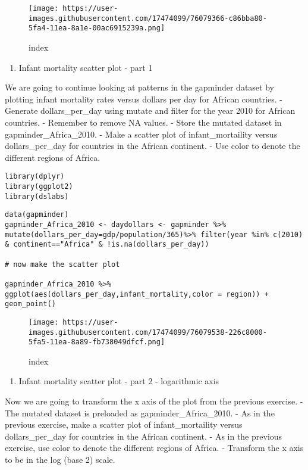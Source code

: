 \documentclass[]{article}
\providecommand{\tightlist}{%
  \setlength{\itemsep}{0pt}\setlength{\parskip}{0pt}}
\begin{document}
\begin{figure}
\centering
\texttt{[image: https://user-images.githubusercontent.com/17474099/76079366-c86bba80-5fa4-11ea-8a1e-00ac6915239a.png]}
\caption{index}
\end{figure}

\begin{enumerate}
\def\labelenumi{\arabic{enumi}.}
\setcounter{enumi}{10}
\tightlist
\item
  Infant mortality scatter plot - part 1
\end{enumerate}

We are going to continue looking at patterns in the gapminder dataset by
plotting infant mortality rates versus dollars per day for African
countries. - Generate dollars\_per\_day using mutate and filter for the
year 2010 for African countries. - Remember to remove NA values. - Store
the mutated dataset in gapminder\_Africa\_2010. - Make a scatter plot of
infant\_mortaility versus dollars\_per\_day for countries in the African
continent. - Use color to denote the different regions of Africa.

\begin{verbatim}
library(dplyr)
library(ggplot2)
library(dslabs)
\end{verbatim}

\begin{verbatim}
data(gapminder)
gapminder_Africa_2010 <- daydollars <- gapminder %>% mutate(dollars_per_day=gdp/population/365)%>% filter(year %in% c(2010) & continent=="Africa" & !is.na(dollars_per_day))

# now make the scatter plot

gapminder_Africa_2010 %>% ggplot(aes(dollars_per_day,infant_mortality,color = region)) + geom_point()
\end{verbatim}

\begin{figure}
\centering
\texttt{[image: https://user-images.githubusercontent.com/17474099/76079538-226c8000-5fa5-11ea-8a89-fb738049dfcf.png]}
\caption{index}
\end{figure}

\begin{enumerate}
\def\labelenumi{\arabic{enumi}.}
\setcounter{enumi}{11}
\tightlist
\item
  Infant mortality scatter plot - part 2 - logarithmic axis
\end{enumerate}

Now we are going to transform the x axis of the plot from the previous
exercise. - The mutated dataset is preloaded as gapminder\_Africa\_2010.
- As in the previous exercise, make a scatter plot of infant\_mortaility
versus dollars\_per\_day for countries in the African continent. - As in
the previous exercise, use color to denote the different regions of
Africa. - Transform the x axis to be in the log (base 2) scale.
\end{document}
